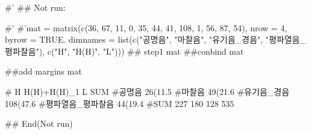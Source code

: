 \documentclass[a4paper]{book}
\begin{document}
\begin{Examples}
\begin{ExampleCode}

#'
\#\# Not run: 

#' #'mat = matrix(c(36, 67, 11,
          0, 35, 44,
         41, 108, 1,
          56, 87, 54),
           nrow = 4, byrow = TRUE.
   dimnames = list(c("공명음", "마찰음",
     "유기음_경음", "평파열음_평파찰음"),  c("H", "H(H)", "L")))
## step1
  mat %
##conbind
 mat %

##add margins
 mat %

 #                           H H(H)+H(H)_1         L SUM
 #공명음             26(11.5%
 #마찰음             49(21.6%
 #유기음_경음       108(47.6%
 #평파열음_평파찰음  44(19.4%
 #SUM                      227         180       128 535







## End(Not run)

\end{ExampleCode}
\end{Examples}
\end{document}

